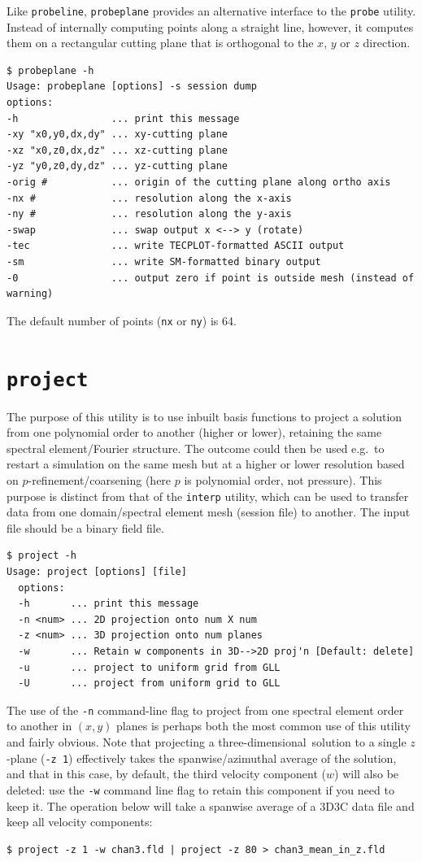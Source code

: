 \documentclass[11pt]{report}
\newcommand\threed{three-di\-men\-sion\-al}
\newcommand{\eg}{e.g.\ } \newcommand{\CC}{\mathrm{c.c.}}
\begin{document}
Like \verb|probeline|, \verb|probeplane| provides an alternative
interface to the \verb|probe| utility.  Instead of internally
computing points along a straight line, however, it computes them on a
rectangular cutting plane that is orthogonal to the $x$, $y$ or $z$
direction.
%
{\small
\begin{verbatim}
$ probeplane -h
Usage: probeplane [options] -s session dump
options:
-h                ... print this message
-xy "x0,y0,dx,dy" ... xy-cutting plane
-xz "x0,z0,dx,dz" ... xz-cutting plane
-yz "y0,z0,dy,dz" ... yz-cutting plane
-orig #           ... origin of the cutting plane along ortho axis
-nx #             ... resolution along the x-axis
-ny #             ... resolution along the y-axis
-swap             ... swap output x <--> y (rotate)
-tec              ... write TECPLOT-formatted ASCII output
-sm               ... write SM-formatted binary output
-0                ... output zero if point is outside mesh (instead of warning)
\end{verbatim}
}
%
\noindent
The default number of points (\verb|nx| or \verb|ny|) is 64.

\section{\texttt{project}}
\label{sec.project}

The purpose of this utility is to use inbuilt basis functions to
project a solution from one polynomial order to another (higher or
lower), retaining the same spectral element/Fourier structure.  The
outcome could then be used \eg to restart a simulation on the same
mesh but at a higher or lower resolution based on
$p$-refinement/coarsening (here $p$ is polynomial order, not
pressure). This purpose is distinct from that of the \verb|interp|
utility, which can be used to transfer data from one domain/spectral
element mesh (session file) to another.  The input file should be a
binary field file.
%
{\small
\begin{verbatim}
$ project -h
Usage: project [options] [file]
  options:
  -h       ... print this message
  -n <num> ... 2D projection onto num X num
  -z <num> ... 3D projection onto num planes
  -w       ... Retain w components in 3D-->2D proj'n [Default: delete]
  -u       ... project to uniform grid from GLL
  -U       ... project from uniform grid to GLL
\end{verbatim}
}
%
The use of the \verb|-n| command-line flag to project from one
spectral element order to another in $(x,y)$ planes is perhaps both
the most common use of this utility and fairly obvious.  Note that
projecting a \threed\ solution to a single $z$-plane (\verb|-z 1|)
effectively takes the spanwise/azimuthal average of the solution, and
that in this case, by default, the third velocity component ($w$) will
also be deleted: use the \verb|-w| command line flag to retain this
component if you need to keep it.  The operation below will take a
spanwise average of a 3D3C data file and keep all velocity components:
%
{\small
\begin{verbatim}
$ project -z 1 -w chan3.fld | project -z 80 > chan3_mean_in_z.fld
\end{verbatim}
}
\end{document}
